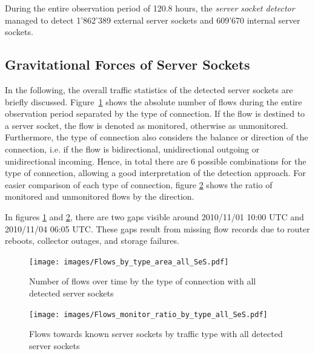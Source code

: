 During the entire observation period of 120.8 hours, the
\emph{server socket detector} managed to detect 1'862'389 external
\glspl{server socket} and 609'670 internal \glspl{server socket}.

\subsection{Gravitational Forces of Server Sockets}
In the following, the overall traffic statistics of the detected
\glspl{server socket} are briefly discussed. Figure \ref{fig:flows_by_type}
shows the absolute number of flows during the entire observation period
separated by the type of connection. If the flow is destined to a
\gls{server socket}, the flow is denoted as monitored, otherwise as unmonitored.
Furthermore, the type of connection also considers the balance or direction of
the connection, i.e. if the flow is bidirectional, unidirectional outgoing or
unidirectional incoming. Hence, in total there are 6 possible combinations for
the type of connection, allowing a good interpretation of the detection
approach. For easier comparison of each type of connection, figure
\ref{fig:monitored_flows_by_type} shows the ratio of monitored and unmonitored
flows by the direction.

In figures \ref{fig:flows_by_type} and \ref{fig:monitored_flows_by_type}, there
are two gaps visible around 2010/11/01 10:00 UTC and 2010/11/04 06:05 UTC. These
gaps result from missing flow records due to router reboots, collector outages,
and storage failures\citep{Schatzmann:Mining}.

\begin{figure}
	[ht] \centering
	\texttt{[image: images/Flows\_by\_type\_area\_all\_SeS.pdf]}
	\caption{Number of flows over time by the type of connection with all detected server sockets}
	\label{fig:flows_by_type}
\end{figure}

\begin{figure}[h]
	\centering
	\texttt{[image: images/Flows\_monitor\_ratio\_by\_type\_all\_SeS.pdf]}
	\caption{Flows towards known server sockets by traffic type with all detected server sockets}
	\label{fig:monitored_flows_by_type}
\end{figure}

